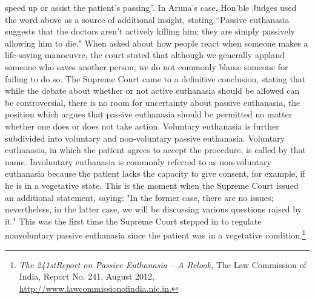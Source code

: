 \begin{multicols}{2}
speed up or assist the patient's passing”. In Aruna's case, Hon’ble Judges used the word above
as a source of additional insight, stating “Passive euthanasia suggests that the doctors aren't
actively killing him; they are simply passively allowing him to die." When asked about how
people react when someone makes a life-saving manoeuvre, the court stated that although we
generally applaud someone who saves another person, we do not commonly blame someone
for failing to do so. The Supreme Court came to a definitive conclusion, stating that while the
debate about whether or not active euthanasia should be allowed can be controversial, there is
no room for uncertainty about passive euthanasia, the position which argues that passive
euthanasia should be permitted no matter whether one does or does not take action. Voluntary
euthanasia is further subdivided into voluntary and non-voluntary passive euthanasia.
Voluntary euthanasia, in which the patient agrees to accept the procedure, is called by that
name. Involuntary euthanasia is commonly referred to as non-voluntary euthanasia because
the patient lacks the capacity to give consent, for example, if he is in a vegetative state. This
is the moment when the Supreme Court issued an additional statement, saying: "In the former
case, there are no issues; nevertheless, in the latter case, we will be discussing various
questions raised by it." This was the first time the Supreme Court stepped in to regulate nonvoluntary passive euthanasia since the patient was in a vegetative condition.\footnote{\textit{The 241stReport on Passive Euthanasia – A Relook,} The Law Commission of India, Report No. 241, August 2012, \url{http://www.lawcommissionofindia.nic.in.}}


\end{multicols}
